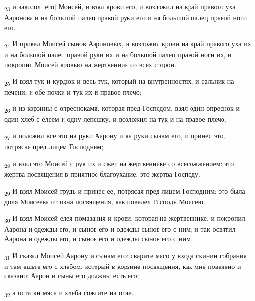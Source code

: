 \begin{tcolorbox}
\textsubscript{23} и заколол [его] Моисей, и взял крови его, и возложил на край правого уха Ааронова и на большой палец правой руки его и на большой палец правой ноги его.
\end{tcolorbox}
\begin{tcolorbox}
\textsubscript{24} И привел Моисей сынов Аароновых, и возложил крови на край правого уха их и на большой палец правой руки их и на большой палец правой ноги их, и покропил Моисей кровью на жертвенник со всех сторон.
\end{tcolorbox}
\begin{tcolorbox}
\textsubscript{25} И взял тук и курдюк и весь тук, который на внутренностях, и сальник на печени, и обе почки и тук их и правое плечо;
\end{tcolorbox}
\begin{tcolorbox}
\textsubscript{26} и из корзины с опресноками, которая пред Господом, взял один опреснок и один хлеб с елеем и одну лепешку, и возложил на тук и на правое плечо;
\end{tcolorbox}
\begin{tcolorbox}
\textsubscript{27} и положил все это на руки Аарону и на руки сынам его, и принес это, потрясая пред лицем Господним;
\end{tcolorbox}
\begin{tcolorbox}
\textsubscript{28} и взял это Моисей с рук их и сжег на жертвеннике со всесожжением: это жертва посвящения в приятное благоухание, это жертва Господу.
\end{tcolorbox}
\begin{tcolorbox}
\textsubscript{29} И взял Моисей грудь и принес ее, потрясая пред лицем Господним: это была доля Моисеева от овна посвящения, как повелел Господь Моисею.
\end{tcolorbox}
\begin{tcolorbox}
\textsubscript{30} И взял Моисей елея помазания и крови, которая на жертвеннике, и покропил Аарона и одежды его, и сынов его и одежды сынов его с ним; и так освятил Аарона и одежды его, и сынов его и одежды сынов его с ним.
\end{tcolorbox}
\begin{tcolorbox}
\textsubscript{31} И сказал Моисей Аарону и сынам его: сварите мясо у входа скинии собрания и там ешьте его с хлебом, который в корзине посвящения, как мне повелено и сказано: Аарон и сыны его должны есть его;
\end{tcolorbox}
\begin{tcolorbox}
\textsubscript{32} а остатки мяса и хлеба сожгите на огне.
\end{tcolorbox}
